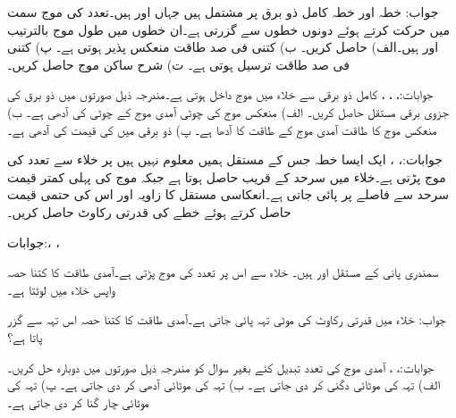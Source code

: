 جواب:
خطہ  اور خطہ  کامل ذو برق پر مشتمل ہیں جہاں  اور  ہیں۔تعدد  کی موج  سمت میں حرکت کرتے ہوئے دونوں خطوں سے گزرتی ہے۔ان خطوں میں طول موج بالترتیب  اور  ہیں۔الف)  حاصل کریں۔ ب) کتنی فی صد طاقت منعکس پذیر ہوتی ہے۔ پ) کتنی فی صد طاقت ترسیل ہوتی ہے۔ ت) شرح ساکن موج  حاصل کریں۔

جوابات:، ، ، 
کامل ذو برقی  سے خلاء میں موج داخل ہوتی ہے۔مندرجہ ذیل صورتوں میں ذو برق کی جزوی برقی مستقل  حاصل کریں۔ الف) منعکس موج کی چوٹی آمدی موج کے چوٹی کی آدھی ہے۔ ب) منعکس موج کا طاقت آمدی موج کے طاقت کا آدھا ہے۔ پ) ذو برقی میں  کی قیمت  کی آدھی ہے۔

جوابات:، ، 
ایک ایسا خطہ جس کے مستقل ہمیں معلوم نہیں ہیں پر خلاء سے  تعدد کی موج پڑتی ہے۔خلاء میں سرحد کے قریب  حاصل ہوتا ہے جبکہ موج کی پہلی کمتر قیمت سرحد سے  فاصلے پر پائی جاتی ہے۔انعکاسی مستقل کا زاویہ  اور اس کی حتمی قیمت  حاصل کرتے ہوئے خطے کی قدرتی رکاوٹ حاصل کریں۔

جوابات:، ،    

سمندری پانی کے مستقل  اور  ہیں۔ خلاء سے اس پر  تعدد کی موج پڑتی ہے۔آمدی طاقت کا کتنا حصہ واپس خلاء میں لوٹتا ہے۔

جواب: 
خلاء میں  قدرتی رکاوٹ کی  موٹی تہہ پائی جاتی ہے۔آمدی طاقت کا کتنا حصہ اس تہہ سے گزر پاتا ہے؟ 

جوابات:، ،  
آمدی موج کی تعدد تبدیل کئے بغیر سوال  کو مندرجہ ذیل صورتوں میں دوبارہ حل کریں۔ الف) تہہ کی موٹائی دگنی کر دی جاتی ہے۔ ب) تہہ کی موٹائی آدھی کر دی جاتی ہے۔ پ) تہہ کی موٹائی  چار گنا کر دی جاتی ہے۔

